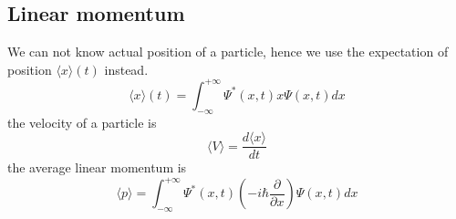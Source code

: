 \subsection{Linear momentum}
We can not know actual position of a particle, hence we use the expectation of position $\langle x\rangle(t)$ instead.
\begin{equation}\boxed{
        \langle x\rangle(t)=\int_{-\infty}^{+\infty}  \Psi^{*}(x, t) x \Psi(x, t) d x}\label{eq4}
\end{equation}
the velocity of a particle is
\begin{equation}\boxed{
        \langle V\rangle = \frac{d\langle x\rangle}{d t}}\label{eq5}
\end{equation}
the average linear momentum is
\begin{equation}\boxed{
        \langle p\rangle=\int_{-\infty}^{+\infty} \Psi^{*}(x, t)\left(-i \hbar \frac{\partial}{\partial x}\right) \Psi(x, t) d x}\label{eq6}
\end{equation}
